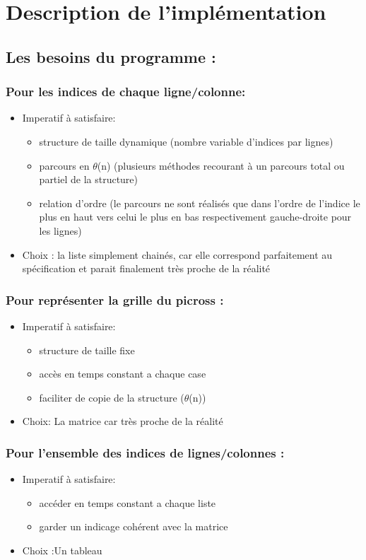 \documentclass{article}
\begin{document}
\section{Description de l'impl\'ementation}
\subsection{ Les besoins du programme :}

\subsubsection{Pour les indices de chaque ligne/colonne:}
\begin{itemize}
\item Imperatif \`a satisfaire:
\begin{itemize}
\item structure de taille dynamique (nombre variable d'indices par lignes)
\item parcours en $\theta$(n) (plusieurs m\'ethodes recourant \`a  un parcours total ou partiel de la structure)
\item relation d'ordre (le parcours ne sont r\'ealis\'es que dans l'ordre de l'indice le plus en haut vers celui le plus en bas respectivement gauche-droite pour les lignes)
\end{itemize}
\item Choix : la liste simplement chain\'es, car elle correspond parfaitement au sp\'ecification et parait finalement tr\`es proche de la r\'ealit\'e
\end{itemize}
\subsubsection{Pour repr\'esenter la grille du picross :}
\begin{itemize}
\item Imperatif \`a satisfaire:
\begin{itemize}
\item structure de taille fixe
\item acc\`es en temps constant a chaque case
\item faciliter de copie de la structure ($\theta$(n))
\end{itemize}
\item Choix: La matrice car tr\`es proche de la r\'ealit\'e
\end{itemize}
\subsubsection{Pour l'ensemble des indices de lignes/colonnes :}
\begin{itemize}
\item Imperatif \`a satisfaire:
\begin{itemize}
\item acc\'eder en temps constant a chaque liste
\item garder un indicage coh\'erent avec la matrice
\end{itemize}
\item Choix :Un tableau
\end{itemize}
\end{document}
